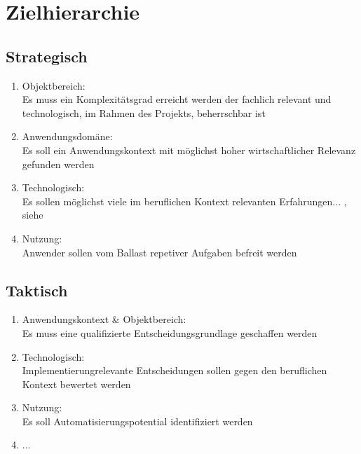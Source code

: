 \chapter{Zielhierarchie}
\label{cha:zielhierarchie}

\begin{comment}
Eine Zielhierarchie lässt sich in drei Ebenen strukturieren.
+ strategische Ziele sind Ziele, die auf langfristige Sicht erreicht werden sollen. 
	Strategische Ziele beantworten die Frage "Was soll erreicht werden?"
+ taktische Ziele sind Ziele, die auf mittelfristige Sicht erreicht werden sollen.
	Taktische Ziele beantworten die Frage "Wie soll es erreicht werden?"
+ operative Ziele sind Ziele, die auf kurzfristige Sicht erreicht werden sollen.
	Operative Ziele beantworten die Frage "durch welche Aktivitäten soll es erreicht werden?" 
Die Zielpriorisierung sollte sich durch die verwendeten Verben (muss,soll,kann) ausdrücken. 
\end{comment}


\section{Strategisch}
\label{sec:zielhierarchie-strategisch}

\begin{enumerate}
\item Objektbereich:\\
Es muss ein Komplexitätsgrad erreicht werden der fachlich relevant und technologisch, im Rahmen des Projekts, beherrschbar ist
\item Anwendungsdomäne:\\
Es soll ein Anwendungskontext mit möglichst hoher wirtschaftlicher Relevanz gefunden werden
\item Technologisch:\\
Es sollen möglichst viele im beruflichen Kontext relevanten Erfahrungen... , siehe \nameref{}
\item Nutzung:\\
Anwender sollen vom Ballast repetiver Aufgaben befreit werden
\end{enumerate}


%
\section{Taktisch}
\label{sec:zielhierarchie-taktisch}

\begin{enumerate}
\item Anwendungskontext \& Objektbereich:\\
Es muss eine qualifizierte Entscheidungsgrundlage geschaffen werden
\item Technologisch:\\
Implementierungrelevante Entscheidungen sollen gegen den beruflichen Kontext bewertet werden
\item Nutzung:\\
Es soll Automatisierungspotential identifiziert werden
\item ...
\end{enumerate}


